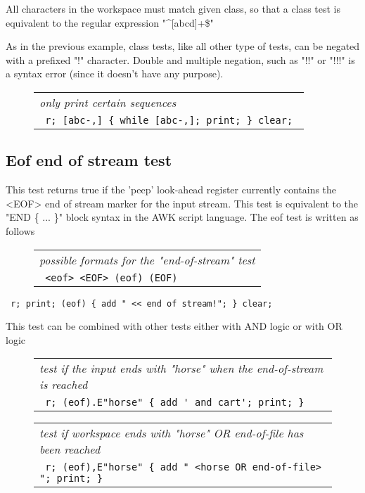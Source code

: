 \documentclass[a4paper,12pt]{article}
\begin{document}
  All characters in the workspace must match given class, so
  that a class test is equivalent to the regular expression "\textasciicircum[abcd]+\$"

  As in the previous example, class tests, like all other type of tests, can
  be negated with a prefixed "!" character. Double and multiple negation,
  such as "!!" or "!!!" is a syntax error (since it doesn't have
  any purpose).
 \begin{figure}
 \begin{tabular}{ l }
 \emph{ only print certain sequences  } \\ 
 \verb| r; [abc-,] { while [abc-,]; print; } clear; |
 \end{tabular} 
 \end{figure}

\subsection{Eof end of stream test}
  
 This test returns true if the 'peep' look-ahead register currently contains
 the <EOF> end of stream marker for the input stream. This test is equivalent
 to the "END \{ ... \}" block syntax in the AWK script language. The eof test is
 written as follows
 \begin{figure}
 \begin{tabular}{ l }
 \emph{ possible formats for the "end-of-stream" test } \\ 
 \verb| <eof> <EOF> (eof) (EOF) |
 \end{tabular} 
 \end{figure} 
 \verb| r; print; (eof) { add " << end of stream!"; } clear; |


 This test can be combined with other tests either with AND
 logic or with OR logic
 \begin{figure}
 \begin{tabular}{ l }
 \emph{ test if the input ends with "horse" when the end-of-stream is reached } \\ 
 \verb| r; (eof).E"horse" { add ' and cart'; print; } |
 \end{tabular} 
 \end{figure}
 \begin{figure}
 \begin{tabular}{ l }
 \emph{ test if workspace ends with "horse" OR end-of-file has been reached  } \\ 
 \verb| r; (eof),E"horse" { add " <horse OR end-of-file> "; print; }  |
 \end{tabular} 
 \end{figure}
  
\end{document}
